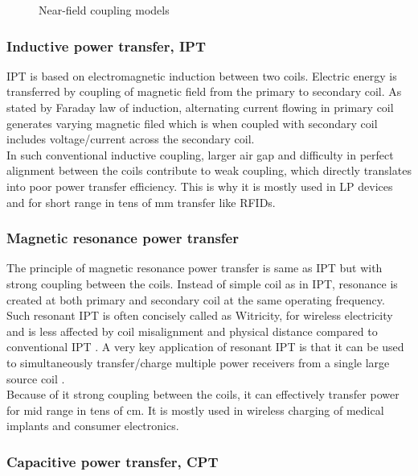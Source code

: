 \documentclass[UKenglish]{ifimaster}  %
\begin{document}
\begin{figure} [htbp]
 	\caption{Near-field coupling models} 
	\label{visio_model_near} 
\end{figure}

\subsubsection{Inductive power transfer, IPT}

IPT is based on electromagnetic induction between two coils. Electric energy is transferred by coupling of 
magnetic field from the primary to secondary coil. As stated by Faraday law of induction, alternating current 
flowing in primary coil generates varying magnetic filed which is when coupled with secondary coil includes 
voltage/current across the secondary coil. \\

In such conventional inductive coupling, larger air gap and difficulty in perfect alignment between the coils 
contribute to weak coupling, which directly translates into poor power transfer efficiency. This is why it is 
mostly used in LP devices and for short range in tens of mm transfer like RFIDs. \\

\subsubsection{Magnetic resonance power transfer}

The principle of magnetic resonance power transfer is same as IPT but with strong coupling between the coils. 
Instead of simple coil as in IPT, resonance is created at both primary and secondary coil at the same operating 
frequency. Such resonant IPT is often concisely called as  Witricity, for wireless electricity and is less 
affected by coil misalignment and physical distance compared to conventional IPT  \cite{wpt_witricity}. A very 
key application of resonant IPT is that it can be used to simultaneously transfer/charge multiple power 
receivers from a single large source coil \cite{wpt_mutliple_device_charging}. \\

Because of it strong coupling between the coils, it can effectively transfer power for mid range in tens of cm. 
It is mostly used in  wireless charging of medical implants and consumer electronics. \\

\subsubsection{Capacitive power transfer, CPT}
\end{document}
